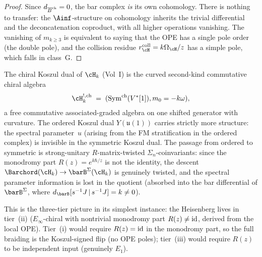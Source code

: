 \begin{proof}
Since $d_{\overline{B}^{\mathrm{ch}}} = 0$, the bar complex \emph{is} its own
cohomology. There is nothing to transfer: the $\Ainf$-structure
on cohomology inherits the trivial differential and the
deconcatenation coproduct, with all higher operations vanishing.
The vanishing of $m_{k\ge 3}$ is equivalent to saying that the
OPE has a single pole order (the double pole),
and the collision residue $r^{\mathrm{coll}}_{\cH}=k\Omega_{\cH}/z$
has a simple pole, which falls in class~G.
\end{proof}

\begin{remark}
\label{rem:heisenberg-chiral-vs-ordered}
The chiral Koszul dual of $\cH_k$ (Vol~I) is the curved
second-kind commutative chiral algebra
\[
\cH_k^{!,\mathrm{ch}}
\;=\;
(\operatorname{Sym}^{\mathrm{ch}}(V^*[1]),m_0=-k\omega),
\]
a free commutative associated-graded algebra on one shifted
generator with curvature.
The ordered Koszul dual $Y(\mathfrak{u}(1))$ carries
strictly more structure: the spectral parameter~$u$
(arising from the FM stratification in the ordered
complex) is invisible in the symmetric Koszul dual.
The passage from ordered to symmetric is
strong-unitary $R$-matrix-twisted $\Sigma_n$-coinvariants: since
the monodromy part $R(z) = e^{k\hbar/z}$ is not the identity,
the descent $\Barchord(\cH_k)\to\barB^{\Sigma}(\cH_k)$
is genuinely twisted, and the spectral parameter
information is lost in the quotient (absorbed into
the bar differential of $\barB^{\Sigma}$, where
$d_{\barB}[\susp^{-1}J\,|\,\susp^{-1}J] = k \neq 0$).

This is the three-tier picture in its simplest instance:
the Heisenberg lives in tier~(ii)
($E_\infty$-chiral with nontrivial monodromy part $R(z)\neq\mathrm{id}$,
derived from the local OPE). Tier~(i) would require
$R(z)=\mathrm{id}$ in the monodromy part, so the full braiding is the
Koszul-signed flip (no OPE poles); tier~(iii) would require $R(z)$ to be
independent input (genuinely $E_1$).
\end{remark}

